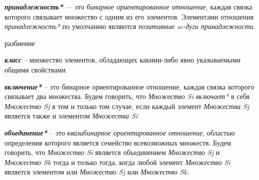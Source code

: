 \begin{SCn}
\end{SCn}

\textbf{\textit{принадлежность*}} --- это \textit{бинарное ориентированное отношение}, каждая связка которого связывает множество с одним из его элементов. Элементами отношения \textit{принадлежность*} по умолчанию являются \textit{позитивные sc-дуги принадлежности}.

\begin{SCn}
\begin{scnrelfromset}{разбиение}
\end{scnrelfromset}
\end{SCn}

\textbf{\textit{класс}} – множество элементов, обладающих какими-либо явно указываемыми общими свойствами.

\begin{SCn}
\end{SCn}

\textbf{\textit{включение*}} – это бинарное ориентированное отношение, каждая связка которого связывает два множества. Будем говорить, что \textit{Множество Si} \textit{включает*} в себя \textit{Множество Sj} в том и только том случае, если каждый элемент \textit{Множества Sj} является также и элементом \textit{Множества Si}

\begin{SCn}
\end{SCn}

\textbf{\textit{объединение*}} – это \textit{квазибинарное ориентированное отношение}, областью определения которого является семейство всевозможных множеств. Будем говорить, что \textit{Множество Si} является объединением \textit{Множество Sj} и \textit{Множество Sk} тогда и только тогда, когда любой элемент \textit{Множество Si} является элементом или \textit{Множество Sj} или \textit{Множество Sk}.


